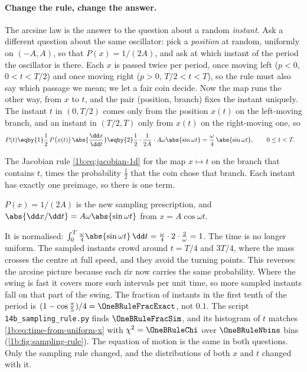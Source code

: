\paragraph{Change the rule, change the answer.}
\label{1b:par:sampling-rule}
The arcsine law is the answer to the question about a random \emph{instant}. Ask a
different question about the same oscillator: pick a \emph{position} at random,
uniformly on $(-A,A)$, so that $P(x)=1/(2A)$, and ask at which instant of the
period the oscillator is there. Each $x$ is passed twice per period, once moving
left ($p<0$, $0<t<T/2$) and once moving right ($p>0$, $T/2<t<T$), so the rule must
also say which passage we mean; we let a fair coin decide. Now the map runs the
other way, from $x$ to $t$, and the pair (position, branch) fixes the instant
uniquely. The instant $t$ in $(0,T/2)$ comes only from the position $x(t)$ on the
left-moving branch, and an instant in $(T/2,T)$ only from $x(t)$ on the right-moving
one, so
\begin{align}
  P(t)
  &\eqby{1} \frac12\,P\bigl(x(t)\bigr)\,\abs{\frac{\dd x}{\dd t}}
   \eqby{2} \frac12\cdot\frac{1}{2A}\cdot A\omega\abs{\sin\omega t}
   = \frac{\omega}{4}\,\abs{\sin\omega t},
  \qquad 0\le t<T .
  \label{1b:eq:time-from-uniform-x}
\end{align}
\begin{explain}
  \item The Jacobian rule \eqref{1b:eq:jacobian-1d} for the map $x\mapsto t$ on the
        branch that contains $t$, times the probability $\frac12$ that the coin chose
        that branch. Each instant has exactly one preimage, so there is one term.
  \item $P(x)=1/(2A)$ is the new sampling prescription, and
        $\abs{\dd x/\dd t}=A\omega\abs{\sin\omega t}$ from $x=A\cos\omega t$.
\end{explain}
It is normalised: $\int_0^T\frac\omega4\abs{\sin\omega t}\,\dd t
=\frac\omega4\cdot2\cdot\frac2\omega=1$. The time is no longer uniform. The
sampled instants crowd around $t=T/4$ and $3T/4$, where the mass crosses the
centre at full speed, and they avoid the turning points. This reverses the arcsine picture because each $\dd x$ now carries the
same probability. Where the swing is fast it covers more such intervals
per unit time, so more sampled instants fall on that part of the swing. The fraction of instants in the first
tenth of the period is $(1-\cos\frac\pi5)/4=\OneBRuleFracExact$, not $0.1$.
The script \texttt{14b\_sampling\_rule.py} finds $\OneBRuleFracSim$, and its
histogram of $t$ matches \eqref{1b:eq:time-from-uniform-x} with
$\chi^2=\OneBRuleChi$ over $\OneBRuleNbins$ bins (\cref{1b:fig:sampling-rule}).
The equation of motion is the same in both questions. Only the sampling rule
changed, and the distributions of both $x$ and $t$ changed with it.


